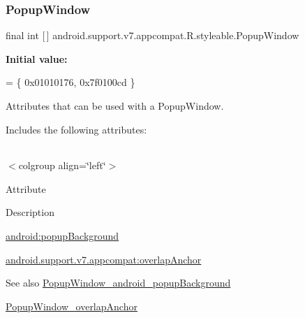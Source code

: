 \subsubsection{\texorpdfstring{Popup\+Window}{PopupWindow}}
{\footnotesize\ttfamily final int \mbox{[}$\,$\mbox{]} android.\+support.\+v7.\+appcompat.\+R.\+styleable.\+Popup\+Window\hspace{0.3cm}{\ttfamily [static]}}

{\bfseries Initial value\+:}
\begin{DoxyCode}
= \{
            0x01010176, 0x7f0100cd
        \}
\end{DoxyCode}
Attributes that can be used with a Popup\+Window. 

Includes the following attributes\+:

\tabulinesep=1mm
\begin{longtabu} spread 0pt [c]{*{0}{|X[-1]}|}
\hline
\end{longtabu}
$<$colgroup align=\char`\"{}left\char`\"{}$>$ 

Attribute

Description 

{\ttfamily \hyperlink{classandroid_1_1support_1_1v7_1_1appcompat_1_1R_1_1styleable_a7da49fb6bb8f58569965ea569167feb7}{android\+:popup\+Background}}

{\ttfamily \hyperlink{classandroid_1_1support_1_1v7_1_1appcompat_1_1R_1_1styleable_a749bd150019d301f69e89f29ccc9a35d}{android.\+support.\+v7.\+appcompat\+:overlap\+Anchor}}

\begin{DoxySeeAlso}{See also}
\hyperlink{classandroid_1_1support_1_1v7_1_1appcompat_1_1R_1_1styleable_a7da49fb6bb8f58569965ea569167feb7}{Popup\+Window\+\_\+android\+\_\+popup\+Background} 

\hyperlink{classandroid_1_1support_1_1v7_1_1appcompat_1_1R_1_1styleable_a749bd150019d301f69e89f29ccc9a35d}{Popup\+Window\+\_\+overlap\+Anchor} 
\end{DoxySeeAlso}
\mbox{\label{classandroid_1_1support_1_1v7_1_1appcompat_1_1R_1_1styleable_a7da49fb6bb8f58569965ea569167feb7}} 
